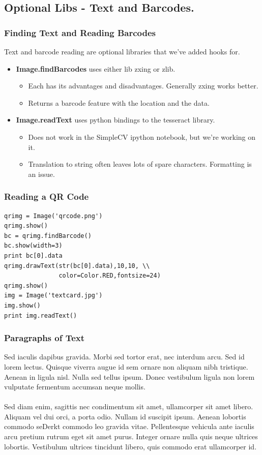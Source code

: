 \documentclass{beamer}
\begin{document}
\subsection{Optional Libs - Text and Barcodes.}
\begin{frame}
  \frametitle{Finding Text and Reading Barcodes}
Text and barcode reading are optional libraries that we've added hooks
for. 
\begin{itemize}
\item \textbf{Image.findBarcodes} uses either lib zxing or zlib. 
  \begin{itemize}
    \item Each has its advantages and disadvantages. Generally zxing works better.
    \item Returns a barcode feature with the location and the data. 
  \end{itemize}
\item \textbf{Image.readText} uses python bindings to the tesseract
  library.
  \begin{itemize}
    \item Does not work in the SimpleCV ipython notebook, but we're
      working on it. 
   \item Translation to string often leaves lots of spare
     characters. Formatting is an issue. 
  \end{itemize}
\end{itemize}
\end{frame}
\begin{frame}[fragile] 
\frametitle{Reading a QR Code}
\begin{example}
\begin{verbatim}
qrimg = Image('qrcode.png')
qrimg.show()
bc = qrimg.findBarcode()
bc.show(width=3)
print bc[0].data
qrimg.drawText(str(bc[0].data),10,10, \\
               color=Color.RED,fontsize=24)
qrimg.show()
img = Image('textcard.jpg')
img.show()
print img.readText()
\end{verbatim}
\end{example}
\end{frame} 
 



\begin{frame}
  \frametitle{Paragraphs of Text}
  Sed iaculis dapibus gravida. Morbi sed tortor erat, nec interdum arcu. Sed id lorem lectus. Quisque viverra augue id sem ornare non aliquam nibh tristique. Aenean in ligula nisl. Nulla sed tellus ipsum. Donec vestibulum ligula non lorem vulputate fermentum accumsan neque mollis.\\~\\

  Sed diam enim, sagittis nec condimentum sit amet, ullamcorper sit
  amet libero. Aliquam vel dui orci, a porta odio. Nullam id suscipit
  ipsum. Aenean lobortis commodo seDerkt commodo leo gravida
  vitae. Pellentesque vehicula ante iaculis arcu pretium rutrum eget
  sit amet purus. Integer ornare nulla quis neque ultrices
  lobortis. Vestibulum ultrices tincidunt libero, quis commodo erat
  ullamcorper id.
\end{frame}
\end{document}

